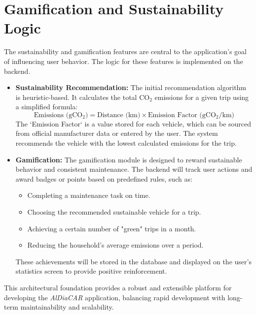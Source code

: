 \section{Gamification and Sustainability Logic}
The sustainability and gamification features are central to the application's goal of influencing user behavior. The logic for these features is implemented on the backend.
\begin{itemize}
    \item \textbf{Sustainability Recommendation:} The initial recommendation algorithm is heuristic-based. It calculates the total CO$_2$ emissions for a given trip using a simplified formula:
    \begin{equation}
        \text{Emissions (gCO$_2$)} = \text{Distance (km)} \times \text{Emission Factor (gCO$_2$/km)}
    \end{equation}
    The `Emission Factor` is a value stored for each vehicle, which can be sourced from official manufacturer data or entered by the user. The system recommends the vehicle with the lowest calculated emissions for the trip.
    \item \textbf{Gamification:} The gamification module is designed to reward sustainable behavior and consistent maintenance. The backend will track user actions and award badges or points based on predefined rules, such as:
    \begin{itemize}
        \item Completing a maintenance task on time.
        \item Choosing the recommended sustainable vehicle for a trip.
        \item Achieving a certain number of "green" trips in a month.
        \item Reducing the household's average emissions over a period.
    \end{itemize}
    These achievements will be stored in the database and displayed on the user's statistics screen to provide positive reinforcement.
\end{itemize}

This architectural foundation provides a robust and extensible platform for developing the \textit{AlDiaCAR} application, balancing rapid development with long-term maintainability and scalability.
